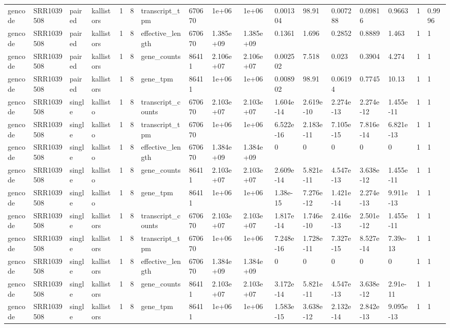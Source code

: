 \begin{tabular}{lllllllllllllllll}
gencode & SRR1039508 & paired & kallistors & 1 & 8 & transcript\_tpm & 670670 & 1e+06 & 1e+06 & 0.001304 & 98.91 & 0.007288 & 0.09816 & 0.9663 & 1 & 0.9996 \\
gencode & SRR1039508 & paired & kallistors & 1 & 8 & effective\_length & 670670 & 1.385e+09 & 1.385e+09 & 0.1361 & 1.696 & 0.2852 & 0.8889 & 1.463 & 1 & 1 \\
gencode & SRR1039508 & paired & kallistors & 1 & 8 & gene\_counts & 86411 & 2.106e+07 & 2.106e+07 & 0.002502 & 7.518 & 0.023 & 0.3904 & 4.274 & 1 & 1 \\
gencode & SRR1039508 & paired & kallistors & 1 & 8 & gene\_tpm & 86411 & 1e+06 & 1e+06 & 0.008902 & 98.91 & 0.06194 & 0.7745 & 10.13 & 1 & 1 \\
gencode & SRR1039508 & single & kallisto & 1 & 8 & transcript\_counts & 670670 & 2.103e+07 & 2.103e+07 & 1.604e-14 & 2.619e-10 & 2.274e-13 & 2.274e-12 & 1.455e-11 & 1 & 1 \\
gencode & SRR1039508 & single & kallisto & 1 & 8 & transcript\_tpm & 670670 & 1e+06 & 1e+06 & 6.522e-16 & 2.183e-11 & 7.105e-15 & 7.816e-14 & 6.821e-13 & 1 & 1 \\
gencode & SRR1039508 & single & kallisto & 1 & 8 & effective\_length & 670670 & 1.384e+09 & 1.384e+09 & 0 & 0 & 0 & 0 & 0 & 1 & 1 \\
gencode & SRR1039508 & single & kallisto & 1 & 8 & gene\_counts & 86411 & 2.103e+07 & 2.103e+07 & 2.609e-14 & 5.821e-11 & 4.547e-13 & 3.638e-12 & 1.455e-11 & 1 & 1 \\
gencode & SRR1039508 & single & kallisto & 1 & 8 & gene\_tpm & 86411 & 1e+06 & 1e+06 & 1.38e-15 & 7.276e-12 & 1.421e-14 & 2.274e-13 & 9.911e-13 & 1 & 1 \\
gencode & SRR1039508 & single & kallistors & 1 & 8 & transcript\_counts & 670670 & 2.103e+07 & 2.103e+07 & 1.817e-14 & 1.746e-10 & 2.416e-13 & 2.501e-12 & 1.455e-11 & 1 & 1 \\
gencode & SRR1039508 & single & kallistors & 1 & 8 & transcript\_tpm & 670670 & 1e+06 & 1e+06 & 7.248e-16 & 1.728e-11 & 7.327e-15 & 8.527e-14 & 7.39e-13 & 1 & 1 \\
gencode & SRR1039508 & single & kallistors & 1 & 8 & effective\_length & 670670 & 1.384e+09 & 1.384e+09 & 0 & 0 & 0 & 0 & 0 & 1 & 1 \\
gencode & SRR1039508 & single & kallistors & 1 & 8 & gene\_counts & 86411 & 2.103e+07 & 2.103e+07 & 3.172e-14 & 5.821e-11 & 4.547e-13 & 3.638e-12 & 2.91e-11 & 1 & 1 \\
gencode & SRR1039508 & single & kallistors & 1 & 8 & gene\_tpm & 86411 & 1e+06 & 1e+06 & 1.583e-15 & 3.638e-12 & 2.132e-14 & 2.842e-13 & 9.095e-13 & 1 & 1 \\

\end{tabular}
